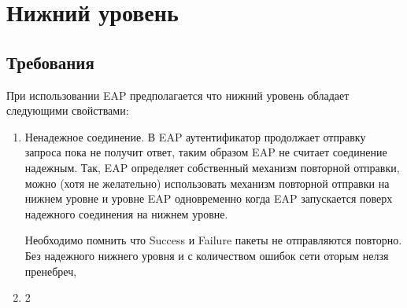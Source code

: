 \section{Нижний уровень}

\subsection{Требования}

При использовании EAP предполагается что нижний уровень обладает следующими свойствами:

\begin{enumerate}
 \item Ненадежное соединение. В EAP аутентификатор продолжает отправку запроса пока не получит ответ, таким образом EAP не считает соединение надежным. Так, EAP определяет собственный механизм повторной отправки, можно (хотя не желательно) использовать механизм повторной отправки на нижнем уровне и уровне EAP одновременно когда EAP запускается поверх надежного соединения на нижнем уровне.

Необходимо помнить что Success и Failure пакеты не отправляются повторно. Без надежного нижнего уровня и с количеством ошибок сети оторым нелзя пренебреч,

 \item 2
\end{enumerate}
